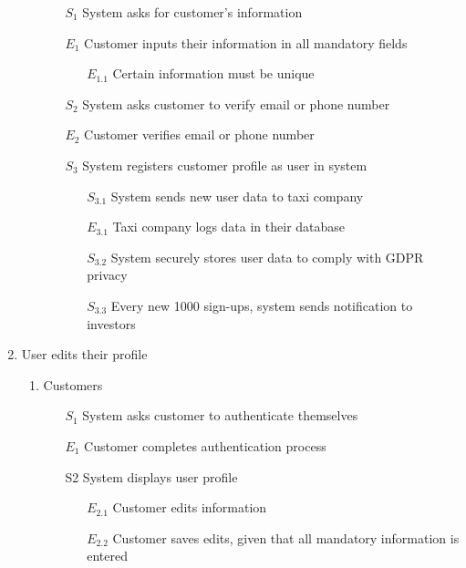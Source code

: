 \documentclass[]{article}
\begin{document}
\begin{enumerate}[{\textbf{BE}}1.]
\begin{enumerate}[{\textbf{VP}1}.1]
            \begin{enumerate}
                \item[$S_1$] System asks for customer’s information
                \item[$E_1$] Customer inputs their information in all mandatory fields
                \begin{enumerate}
                \item[$E_{1.1}$] Certain information must be unique
                \end{enumerate}
                \item[$S_2$] System asks customer to verify email or phone number
                \item[$E_2$] Customer verifies email or phone number
                \item[$S_3$] System registers customer profile as user in system
                \begin{enumerate}
                \item[$S_{3.1}$] System sends new user data to taxi company
                \item[$E_{3.1}$] Taxi company logs data in their database
                \item[$S_{3.2}$] System securely stores user data to comply with GDPR privacy
\color{blue}
                \item[$S_{3.3}$] Every new 1000 sign-ups, system sends notification to investors
\color{black}
                \end{enumerate}
            \end{enumerate}
    \end{enumerate}
    \item User edits their profile
    \begin{enumerate}[{VP2}.1]
        \item Customers
            \begin{enumerate}
                \item[$S_1$] System asks customer to authenticate themselves
                    \item[$E_1$] Customer completes authentication process
                \item[S2] System displays user profile
                \begin{enumerate}
                    \item[$E_{2.1}$] Customer edits information
                    \item[$E_{2.2}$] Customer saves edits, given that all mandatory information is entered

\end{enumerate}
\end{enumerate}
\end{enumerate}
\end{enumerate}
\end{document}
